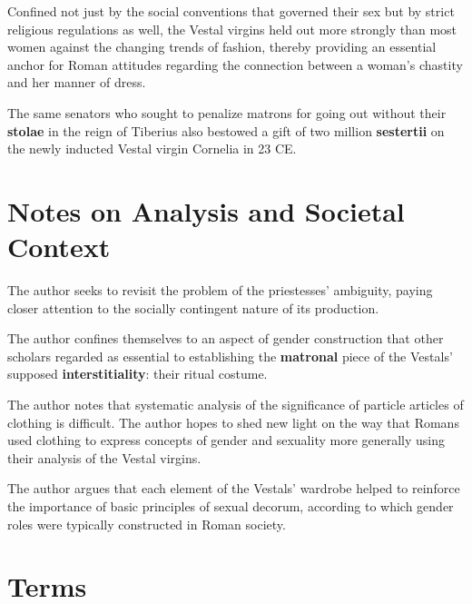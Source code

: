 Confined not just by the social conventions that governed their sex but by strict religious regulations as well, the Vestal virgins held out more strongly than most women against the changing trends of fashion, thereby providing an essential anchor for Roman attitudes regarding the connection between a woman's chastity and her manner of dress.

\begin{rmk}
    The same senators who sought to penalize matrons for going out without their \textbf{stolae} in the reign of Tiberius also bestowed a gift of two million \textbf{sestertii} on the newly inducted Vestal virgin Cornelia in 23 CE.
\end{rmk}




\section{Notes on Analysis and Societal Context}
\label{sec:SocCont10}


The author seeks to revisit the problem of the priestesses' ambiguity, paying closer attention to the socially contingent nature of its production. 

\begin{rmk}
    The author confines themselves to an aspect of gender construction that other scholars regarded as essential to establishing the \textbf{matronal} piece of the Vestals' supposed \textbf{interstitiality}: their ritual costume.
\end{rmk}

The author notes that systematic analysis of the significance of particle articles of clothing is difficult. The author hopes to shed new light on the way that Romans used clothing to express concepts of gender and sexuality more generally using their analysis of the Vestal virgins.

\begin{nte}
    The author argues that each element of the Vestals' wardrobe helped to reinforce the importance of basic principles of sexual decorum, according to which gender roles were typically constructed in Roman society.
\end{nte}





\section{Terms}
\label{sec:terms10}

